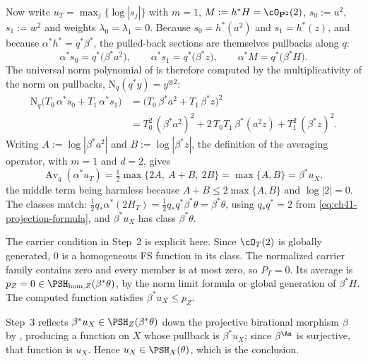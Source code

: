 \begin{example}
Now write $u_T=\max_j\{\log|s_j|\}$ with $m=1$,
$M:=h^*H=\cO_{\mathbf P^2}(2)$, $s_0:=u^2$, $s_1:=w^2$ and weights
$\lambda_0=\lambda_1=0$.  Because $s_0=h^*(a^2)$ and $s_1=h^*(z)$, and
because $\alpha^*h^*=q^*\beta^*$, the pulled-back sections are themselves
pullbacks along $q$:
\[
 \alpha^*s_0=q^*\bigl(\beta^*a^2\bigr),
 \qquad
 \alpha^*s_1=q^*\bigl(\beta^*z\bigr),
 \qquad
 \alpha^*M=q^*\bigl(\beta^*H\bigr).
\]
The universal norm polynomial of  is
therefore computed by the multiplicativity of the norm on pullbacks,
$\mathrm N_q(q^*y)=y^{\otimes2}$:
\[
 \begin{aligned}
 \mathrm N_q\bigl(T_0\,\alpha^*s_0+T_1\,\alpha^*s_1\bigr)
 &=\bigl(T_0\,\beta^*a^2+T_1\,\beta^*z\bigr)^{2}\\
 &=T_0^2\,(\beta^*a^2)^2+2\,T_0T_1\,\beta^*(a^2z)+T_1^2\,(\beta^*z)^2 .
 \end{aligned}
\]
Writing $A:=\log|\beta^*a^2|$ and $B:=\log|\beta^*z|$, the definition of
the averaging operator, with $m=1$ and $d=2$, gives
\[
 \operatorname{Av}_q(\alpha^*u_T)
 =\tfrac12\max\bigl\{2A,\ A+B,\ 2B\bigr\}
 =\max\{A,B\}
 =\beta^*u_X ,
\]
the middle term being harmless because $A+B\le2\max\{A,B\}$ and
$\log|2|=0$.  The classes match:
$\tfrac12q_*\alpha^*(2H_T)=\tfrac12q_*q^*\beta^*\theta=\beta^*\theta$,
using $q_*q^*=2$ from \eqref{eq:ch41-projection-formula}, and
$\beta^*u_X$ has class $\beta^*\theta$.

The carrier condition in Step~2 is explicit here.
Since $\cO_T(2)$ is globally generated, $0$ is a homogeneous FS
function in its class.  The normalized carrier family contains zero
and every member is at most zero, so $P_T=0$.
Its average is $p_Z=0\in\PSH_{\mathrm{hom},Z}(\beta^*\theta)$,
by the norm limit formula or global generation of $\beta^*H$.
The computed function satisfies $\beta^*u_X\le p_Z$.

Step~3 reflects $\beta^*u_X\in\PSH_Z(\beta^*\theta)$ down the projective
birational morphism $\beta$ by , producing
a function on $X$ whose pullback is $\beta^*u_X$; since $\beta^{\An}$
is surjective, that function is $u_X$.  Hence
$u_X\in\PSH_X(\theta)$, which is the conclusion.


\end{example}
